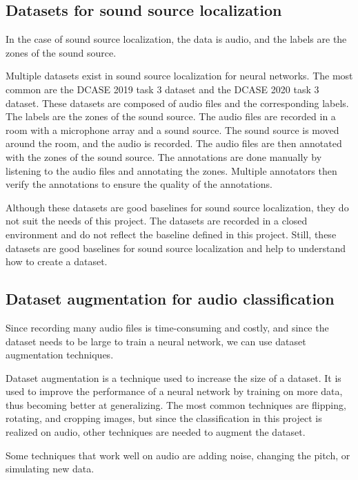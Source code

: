 \subsection{Datasets for sound source localization}
\label{sec:datasetsSSL}

In the case of sound source localization, the data is audio, and the labels are the zones of the sound source. 

Multiple datasets exist in sound source localization for neural networks. The most common are the DCASE 2019 task 3 dataset\cite{Adavanne2019_DCASE} and the DCASE 2020 task 3 dataset\cite{politis2020dataset}. These datasets are composed of audio files and the corresponding labels. The labels are the zones of the sound source. The audio files are recorded in a room with a microphone array and a sound source. The sound source is moved around the room, and the audio is recorded. The audio files are then annotated with the zones of the sound source. The annotations are done manually by listening to the audio files and annotating the zones. Multiple annotators then verify the annotations to ensure the quality of the annotations. 

Although these datasets are good baselines for sound source localization, they do not suit the needs of this project. The datasets are recorded in a closed environment and do not reflect the baseline defined in this project. Still, these datasets are good baselines for sound source localization and help to understand how to create a dataset.

\subsection{Dataset augmentation for audio classification}
Since recording many audio files is time-consuming and costly, and since the dataset needs to be large to train a neural network, we can use dataset augmentation techniques.

Dataset augmentation is a technique used to increase the size of a dataset. It is used to improve the performance of a neural network by training on more data, thus becoming better at generalizing. The most common techniques\cite{yang2022image} are flipping, rotating, and cropping images, but since the classification in this project is realized on audio, other techniques are needed to augment the dataset. 

Some techniques that work well on audio are adding noise, changing the pitch, or simulating new data\cite{ghilardi2019automatic}. 

